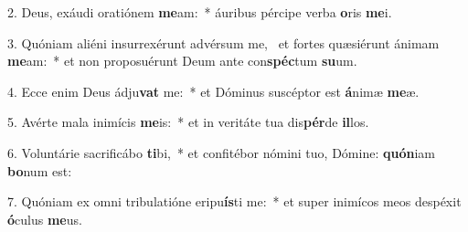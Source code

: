 2. Deus, exáudi oratiónem \textbf{me}am:~*  áuribus pércipe verba \textbf{o}ris \textbf{me}i.\

3. Quóniam aliéni insurrexérunt advérsum me, \dag\  et fortes quæsiérunt ánimam \textbf{me}am:~*  et non proposuérunt Deum ante con\textbf{spéc}tum \textbf{su}um.\

4. Ecce enim Deus ádju\textbf{vat} me:~*  et Dóminus suscéptor est \textbf{á}nimæ \textbf{me}æ.\

5. Avérte mala inimícis \textbf{me}is:~*  et in veritáte tua dis\textbf{pér}de \textbf{il}los.\

6. Voluntárie sacrificábo \textbf{ti}bi,~*  et confitébor nómini tuo, Dómine: \textbf{quón}iam \textbf{bo}num est:\

7. Quóniam ex omni tribulatióne eripu\textbf{ís}ti me:~*  et super inimícos meos despéxit \textbf{ó}culus \textbf{me}us.\

